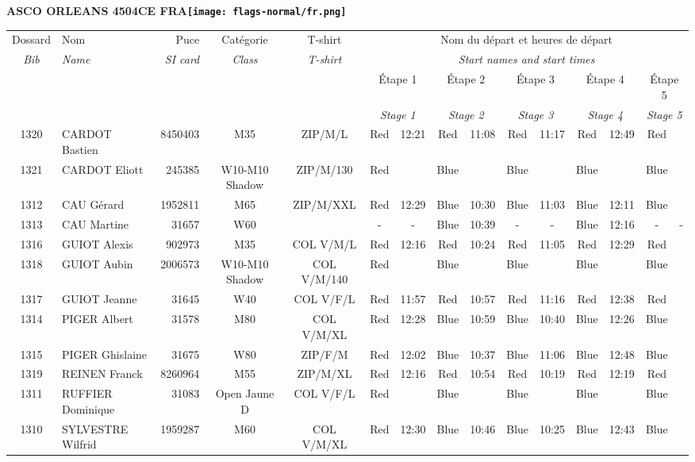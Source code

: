 \documentclass{report}
\begin{document}
\newpage
  \Huge \centering \bfseries ASCO ORLEANS 4504CE FRA\normalfont \footnotesize \sffamily \hfill \texttt{[image: flags-normal/fr.png]} \newline 
  \begin{longtable}{|c|l|r|c|c|*{5}{cc|}}
    Dossard & Nom  & Puce    & Catégorie & T-shirt & \multicolumn{10}{c|}{Nom du départ et heures de départ} \\
    \itshape Bib     & \itshape Name & \itshape SI card & \itshape Class  & \itshape  T-shirt  & \multicolumn{10}{c|}{\itshape Start names and start times} \\
    \hline
    & & & & & \multicolumn{2}{c|}{Étape 1} & \multicolumn{2}{c|}{Étape 2} & \multicolumn{2}{c|}{Étape 3} & \multicolumn{2}{c|}{Étape 4} & \multicolumn{2}{c|}{Étape 5} \\
    & & & & & \multicolumn{2}{c|}{\itshape Stage 1} & \multicolumn{2}{c|}{\itshape Stage 2} & \multicolumn{2}{c|}{\itshape Stage 3} & \multicolumn{2}{c|}{\itshape Stage 4} & \multicolumn{2}{c|}{\itshape Stage 5} \\
    \hline
    1320 & CARDOT Bastien & 8450403 & M35 & ZIP/M/L & Red & 12:21 & Red & 11:08 & Red & 11:17 & Red & 12:49 & Red &  \\
    1321 & CARDOT Eliott & 245385 & W10-M10 Shadow & ZIP/M/130 & Red &   & Blue &   & Blue &   & Blue &   & Blue &  \\
    1312 & CAU Gérard & 1952811 & M65 & ZIP/M/XXL & Red & 12:29 & Blue & 10:30 & Blue & 11:03 & Blue & 12:11 & Blue &  \\
    1313 & CAU Martine & 31657 & W60 &   & - &  - & Blue & 10:39 & - &  - & Blue & 12:16 & - &  -\\
    1316 & GUIOT Alexis & 902973 & M35 & COL V/M/L & Red & 12:16 & Red & 10:24 & Red & 11:05 & Red & 12:29 & Red &  \\
    1318 & GUIOT Aubin & 2006573 & W10-M10 Shadow & COL V/M/140 & Red &   & Blue &   & Blue &   & Blue &   & Blue &  \\
    1317 & GUIOT Jeanne & 31645 & W40 & COL V/F/L & Red & 11:57 & Red & 10:57 & Red & 11:16 & Red & 12:38 & Red &  \\
    1314 & PIGER Albert & 31578 & M80 & COL V/M/XL & Red & 12:28 & Blue & 10:59 & Blue & 10:40 & Blue & 12:26 & Blue &  \\
    1315 & PIGER Ghislaine & 31675 & W80 & ZIP/F/M & Red & 12:02 & Blue & 10:37 & Blue & 11:06 & Blue & 12:48 & Blue &  \\
    1319 & REINEN Franck & 8260964 & M55 & ZIP/M/XL & Red & 12:16 & Red & 10:54 & Red & 10:19 & Red & 12:19 & Red &  \\
    1311 & RUFFIER Dominique & 31083 & Open Jaune D & COL V/F/L & Red &   & Blue &   & Blue &   & Blue &   & Blue &  \\
    1310 & SYLVESTRE Wilfrid & 1959287 & M60 & COL V/M/XL & Red & 12:30 & Blue & 10:46 & Blue & 10:25 & Blue & 12:43 & Blue &  \\
  \end{longtable}
\end{document}
